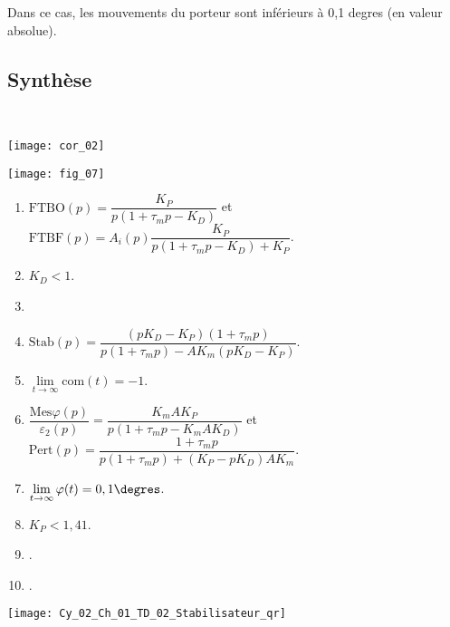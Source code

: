 \fi


\ifprof
\begin{corrige}
Dans ce cas, les mouvements du porteur sont inférieurs à 0,1 degres (en valeur absolue).
\end{corrige}
\else
\fi


\subsection*{Synthèse}
\ifprof
\begin{corrige}~\\
\begin{center}
\texttt{[image: cor\_02]}
\end{center}
\end{corrige}
\else
\begin{center}
\texttt{[image: fig\_07]}
\end{center}
\fi

\ifcolle
\else
\ifprof
\else
\begin{solution}
\begin{enumerate}
\item $\text{FTBO}(p)=\dfrac{ K_P}{p\left(1+\tau_m p-K_D \right)}$ et $\text{FTBF}(p)=A_i(p)\dfrac{K_P}{p\left(1+\tau_m p- K_D \right)+K_P}$.
\item $K_D < 1$.
\item 
\item $\text{Stab}(p)=\dfrac{\left(pK_D-K_P \right) \left(1+\tau_m p\right)}{p\left(1+\tau_m p \right) - AK_m \left( pK_D-K_P\right) }$.
\item $\lim\limits_{t\to\infty}\text{com}(t)=-1$.
\item $\dfrac{\text{Mes}\varphi(p)}{\varepsilon_2(p)} = \dfrac{K_m A K_P}{p\left(1+\tau_m p-K_m A K_D \right)}$  et $\text{Pert}(p)=\dfrac{1+\tau_m p}{p \left(1+\tau_m p\right)+\left(K_P-pK_D\right)AK_m}$.
\item $\lim\limits_{t\to\infty}\varphi(t) = 0,1\degres$.
\item $K_P < 1,41 $.
\item .
\item .
\end{enumerate}
\end{solution}%
\fi
\fi


\ifprof
\else
\begin{marginfigure}[-3cm]
\centering
\texttt{[image: Cy\_02\_Ch\_01\_TD\_02\_Stabilisateur\_qr]}
\end{marginfigure}
\fi